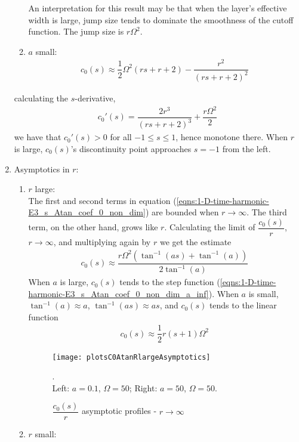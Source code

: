 \documentclass[12pt,twoside]{article}
\begin{document}
\begin{enumerate}
\begin{enumerate}
An interpretation for this result may be that when the layer's effective width is large, jump size tends to dominate the smoothness of the cutoff function. The jump size is $r \Omega^2$.
	\item $a$ small:
	\begin{align}
	c_0(s) \approx \dfrac{1}{2} \Omega ^2 (r s+r+2)-\dfrac{r^2}{(r s+r
	+2)^2}
	\end{align}
	\end{enumerate}
	calculating the $s$-derivative,
	\begin{align*}
	c_0'(s) = \dfrac{2 r^3}{(r s+r+2)^3}+\dfrac{r \Omega ^2}{2} 
	\end{align*}
	we have that $c_0'(s)>0$ for all $-1 \leq s \leq 1$, hence monotone 		there. When $r$ is large, $c_0(s)$'s discontinuity point approaches 		$s=-1$ from the left.
\item Asymptotics in $r$:
	\begin{enumerate}
	\item $r$ large:\\
	The first and second terms in equation (\ref{eqns:1-D-time-harmonic-E3_s_Atan_coef_0_non_dim}) are bounded when $r \rightarrow \infty$. The third term, on the other hand, grows like $r$. Calculating the limit of $\dfrac{c_0(s)}{r}$, $r \rightarrow \infty$, and multiplying again by $r$ we get the estimate
	\begin{align}
	c_0(s) \approx \dfrac{r\Omega ^2 \left(\tan ^{-1}(a s)+\tan ^{-1}(a)\right)}{2 \tan ^{-1}(a)}
	\end{align}
	When $a$ is large, $c_0(s)$ tends to the step function (\ref{eqns:1-D-time-harmonic-E3_s_Atan_coef_0_non_dim_a_inf}). When $a$ is small, $\tan^{-1}(a) \approx a$, $\tan^{-1}(as) \approx as$, and $c_0(s)$ tends to the linear function 
	\begin{align}
	c_0(s) \approx \dfrac{1}{2} r (s+1) \Omega ^2
	\end{align}
	
\begin{figure} 
\begin{center}
\texttt{[image: plotsC0AtanRlargeAsymptotics]}
\end{center}
\caption {$\dfrac{c_0(s)}{r}$ asymptotic profiles - $r \rightarrow \infty$}.\\
Left: $a = 0.1$, $\Omega = 50$; Right: $a = 50$, $\Omega=50$.
\label{fig:c0AtanRlim}
\end{figure}

	\item $r$ small:\\
	

\end{enumerate}
\end{enumerate}
\end{document}
